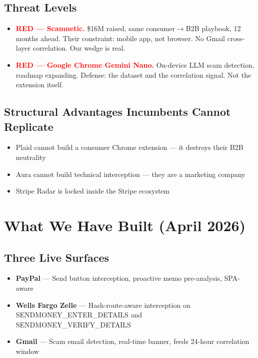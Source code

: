 \documentclass[12pt, letterpaper]{article}
\begin{document}
\subsection{Threat Levels}

\begin{itemize}
  \item \textcolor{red}{\textbf{RED --- Scamnetic.}} \$16M raised, same consumer$\rightarrow$B2B playbook, 12 months ahead. Their constraint: mobile app, not browser. No Gmail cross-layer correlation. Our wedge is real.
  \item \textcolor{red}{\textbf{RED --- Google Chrome Gemini Nano.}} On-device LLM scam detection, roadmap expanding. Defense: the dataset and the correlation signal. Not the extension itself.
\end{itemize}

\subsection{Structural Advantages Incumbents Cannot Replicate}

\begin{itemize}
  \item Plaid cannot build a consumer Chrome extension --- it destroys their B2B neutrality
  \item Aura cannot build technical interception --- they are a marketing company
  \item Stripe Radar is locked inside the Stripe ecosystem
\end{itemize}

\section{What We Have Built (April 2026)}

\subsection{Three Live Surfaces}

\begin{itemize}
  \item \textbf{PayPal} --- Send button interception, proactive memo pre-analysis, SPA-aware
  \item \textbf{Wells Fargo Zelle} --- Hash-route-aware interception on SENDMONEY\_ENTER\_DETAILS and SENDMONEY\_VERIFY\_DETAILS
  \item \textbf{Gmail} --- Scam email detection, real-time banner, feeds 24-hour correlation window
\end{itemize}
\end{document}
